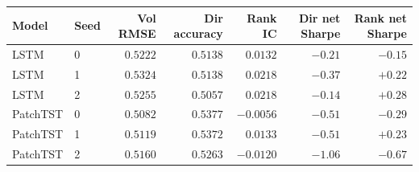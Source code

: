 \begin{tabular}{llrrrrr}
\toprule
Model & Seed & Vol RMSE & Dir accuracy & Rank IC & Dir net Sharpe & Rank net Sharpe \\
\midrule
LSTM & 0 & $0.5222$ & $0.5138$ & $0.0132$ & $-0.21$ & $-0.15$ \\
LSTM & 1 & $0.5324$ & $0.5138$ & $0.0218$ & $-0.37$ & $+0.22$ \\
LSTM & 2 & $0.5255$ & $0.5057$ & $0.0218$ & $-0.14$ & $+0.28$ \\
PatchTST & 0 & $0.5082$ & $0.5377$ & $-0.0056$ & $-0.51$ & $-0.29$ \\
PatchTST & 1 & $0.5119$ & $0.5372$ & $0.0133$ & $-0.51$ & $+0.23$ \\
PatchTST & 2 & $0.5160$ & $0.5263$ & $-0.0120$ & $-1.06$ & $-0.67$ \\
\bottomrule
\end{tabular}
